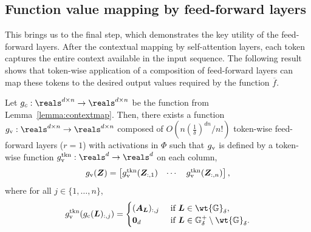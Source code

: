 \documentclass{article} %
\def\vzero{{\bm{0}}}
\def\mA{{\bm{A}}}
\def\mL{{\bm{L}}}
\def\mZ{{\bm{Z}}}
\def\sG{{\mathbb{G}}}
\begin{document}

\vspace*{-3pt}
\subsection{Function value mapping by feed-forward layers}
\vspace*{-3pt}
\label{sec:ff-value-mapping}
This brings us to the final step, which demonstrates the key utility of the feed-forward layers. After the contextual mapping by self-attention layers, each token captures the entire context available in the input sequence. The following result shows that token-wise application of a composition of feed-forward layers can map these tokens to the desired output values required by the function $\overline{f}$. 

\begin{lemma}
\label{lemma:memorize}
Let $g_c : \reals^{d \times n} \to \reals^{d\times n}$ be the function from Lemma~\ref{lemma:contextmap}. Then, there exists a function $g_{\rm v}: \reals^{d \times n} \to \reals^{d \times n}$ composed of $O(n (\frac{1}{\delta})^{dn}/n!)$ token-wise feed-forward layers \textup{($r=1$)} with activations in $\Phi$ such that $g_{\rm v}$ is defined by a token-wise function $g_{\rm v}^{\rm tkn}:\reals^d \to \reals^d$ on each column,
\begin{equation*}
    g_{\rm v} (\mZ) = 
    \begin{bmatrix}
    g_{\rm v}^{\rm tkn} (\mZ_{:, 1}) &
    \cdots &
    g_{\rm v}^{\rm tkn} (\mZ_{:, n})
    \end{bmatrix},
\end{equation*}
where for all $j \in \{1, \dots, n\}$,
\begin{equation*}
    g_{\rm v}^{\rm tkn}(g_{\rm c}(\mL)_{:,j}) =
    \begin{cases}
        (\mA_{\mL})_{:,j} & \text{ if } \mL \in \wt {\sG}_{\delta},\\
        \vzero_{d} & \text{ if } \mL \in \sG^+_{\delta} \setminus \wt {\sG}_{\delta}.
    \end{cases}
\end{equation*}
\end{lemma}
\end{document}
